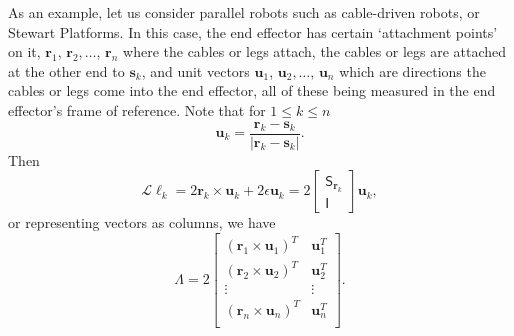 \documentclass[reqno,12pt]{amsart}
\newcommand\starop[1]{\mathsf S_{#1}}
\begin{document}
As an example, let us consider parallel robots such as cable-driven robots, or Stewart Platforms.  In this case, the end effector has certain `attachment points' on it, $\bm r_1$, $\bm r_2,\dots$, $\bm r_n$ where the cables or legs attach, the cables or legs are attached at the other end to $\bm s_k$,
and unit vectors $\bm u_1$, $\bm u_2,\dots$, $\bm u_n$ which are directions the cables or legs come into the end effector, all of these being measured in the end effector's frame of reference.  Note that for $1 \le k \le n$
\begin{equation}
\bm u_k = \frac{\bm r_k - \bm s_k}{|\bm r_k - \bm s_k|} .
\end{equation}
Then
\begin{equation}
\label{L ell_k}
\mathcal L \ell_k = 2 \bm r_k \times \bm u_k + 2 \epsilon \bm u_k = 2 \begin{bmatrix} \starop{\bm r_k} \\ \mathsf I \end{bmatrix} \bm u_k,
\end{equation}
or representing vectors as columns, we have
\begin{equation}
\label{Lambda stewart platform}
\mathsf\Lambda = 2 \begin{bmatrix}
(\bm r_1 \times \bm u_1)^T & \bm u_1^T \\
(\bm r_2 \times \bm u_2)^T & \bm u_2^T \\
\vdots & \vdots \\
(\bm r_n \times \bm u_n)^T & \bm u_n^T \\
\end{bmatrix} .
\end{equation}
\end{document}
